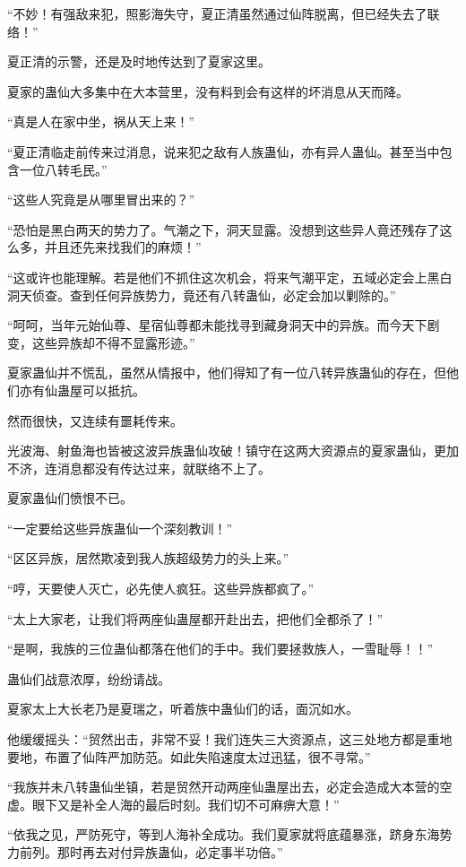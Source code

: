\begin{this_body}
“不妙！有强敌来犯，照影海失守，夏正清虽然通过仙阵脱离，但已经失去了联络！”

夏正清的示警，还是及时地传达到了夏家这里。

夏家的蛊仙大多集中在大本营里，没有料到会有这样的坏消息从天而降。

“真是人在家中坐，祸从天上来！”

“夏正清临走前传来过消息，说来犯之敌有人族蛊仙，亦有异人蛊仙。甚至当中包含一位八转毛民。”

“这些人究竟是从哪里冒出来的？”

“恐怕是黑白两天的势力了。气潮之下，洞天显露。没想到这些异人竟还残存了这么多，并且还先来找我们的麻烦！”

“这或许也能理解。若是他们不抓住这次机会，将来气潮平定，五域必定会上黑白洞天侦查。查到任何异族势力，竟还有八转蛊仙，必定会加以剿除的。”

“呵呵，当年元始仙尊、星宿仙尊都未能找寻到藏身洞天中的异族。而今天下剧变，这些异族却不得不显露形迹。”

夏家蛊仙并不慌乱，虽然从情报中，他们得知了有一位八转异族蛊仙的存在，但他们亦有仙蛊屋可以抵抗。

然而很快，又连续有噩耗传来。

光波海、射鱼海也皆被这波异族蛊仙攻破！镇守在这两大资源点的夏家蛊仙，更加不济，连消息都没有传达过来，就联络不上了。

夏家蛊仙们愤恨不已。

“一定要给这些异族蛊仙一个深刻教训！”

“区区异族，居然欺凌到我人族超级势力的头上来。”

“哼，天要使人灭亡，必先使人疯狂。这些异族都疯了。”

“太上大家老，让我们将两座仙蛊屋都开赴出去，把他们全都杀了！”

“是啊，我族的三位蛊仙都落在他们的手中。我们要拯救族人，一雪耻辱！！”

蛊仙们战意浓厚，纷纷请战。

夏家太上大长老乃是夏瑞之，听着族中蛊仙们的话，面沉如水。

他缓缓摇头：“贸然出击，非常不妥！我们连失三大资源点，这三处地方都是重地要地，布置了仙阵严加防范。如此失陷速度太过迅猛，很不寻常。”

“我族并未八转蛊仙坐镇，若是贸然开动两座仙蛊屋出去，必定会造成大本营的空虚。眼下又是补全人海的最后时刻。我们切不可麻痹大意！”

“依我之见，严防死守，等到人海补全成功。我们夏家就将底蕴暴涨，跻身东海势力前列。那时再去对付异族蛊仙，必定事半功倍。”


\end{this_body}
